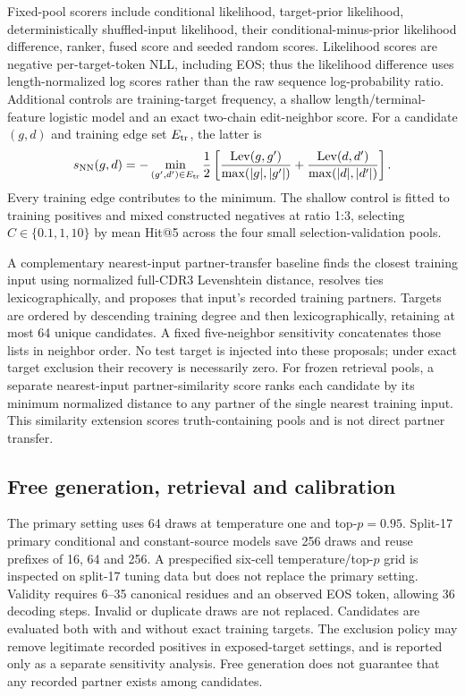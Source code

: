 \documentclass[12pt]{article}
\begin{document}
Fixed-pool scorers include conditional likelihood, target-prior likelihood,
deterministically shuffled-input likelihood, their conditional-minus-prior
likelihood difference, ranker, fused score and seeded random scores.
Likelihood scores are negative per-target-token NLL, including EOS; thus the
likelihood difference uses length-normalized log scores rather than the raw
sequence log-probability ratio. Additional
controls are training-target frequency, a shallow length/terminal-feature
logistic model and an exact two-chain edit-neighbor score. For a candidate
$(g,d)$ and training edge set $E_{\rm tr}$, the latter is
\begin{equation}
s_{\rm NN}(g,d)=-\min_{(g',d')\in E_{\rm tr}}
\frac{1}{2}\left[
\frac{\operatorname{Lev}(g,g')}{\max(|g|,|g'|)}+
\frac{\operatorname{Lev}(d,d')}{\max(|d|,|d'|)}\right].
\end{equation}
Every training edge contributes to the minimum. The shallow control is fitted
to training positives and mixed constructed negatives at ratio 1:3, selecting
$C\in\{0.1,1,10\}$ by mean Hit@5 across the four small selection-validation pools.

A complementary nearest-input partner-transfer baseline finds the closest
training input using normalized full-CDR3 Levenshtein distance, resolves ties
lexicographically, and proposes that input's recorded training partners. Targets
are ordered by descending training degree and then lexicographically, retaining
at most 64 unique candidates. A fixed five-neighbor sensitivity concatenates
those lists in neighbor order. No test target is injected into these proposals;
under exact target exclusion their recovery is necessarily zero. For frozen
retrieval pools, a separate nearest-input partner-similarity score ranks each
candidate by its minimum normalized distance to any partner of the single
nearest training input. This similarity extension scores truth-containing
pools and is not direct partner transfer.

\subsection{Free generation, retrieval and calibration}
The primary setting uses 64 draws at temperature one and top-$p=0.95$.
Split-17 primary conditional and constant-source models save 256 draws and
reuse prefixes of 16, 64 and 256. A prespecified six-cell temperature/top-$p$
grid is inspected on split-17 tuning data but does not replace the primary
setting. Validity requires 6--35 canonical residues and an observed EOS token,
allowing 36 decoding steps. Invalid or duplicate draws are not replaced.
Candidates are evaluated both with and without exact training targets. The
exclusion policy may remove legitimate recorded positives in exposed-target
settings, and is reported only as a separate sensitivity analysis. Free
generation does not guarantee that any recorded partner exists among candidates.
\end{document}
